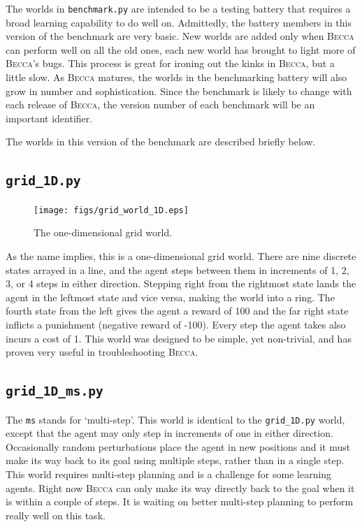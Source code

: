 The worlds in \texttt{benchmark.py} are intended to be a testing battery that requires a broad learning capability to do well on. Admittedly, the battery members in this version of the benchmark are very basic. New worlds are added only when \textsc{Becca} can perform well on all the old ones, each new world has brought to light more of \textsc{Becca}'s bugs. This process is great for ironing out the kinks in \textsc{Becca}, but a little slow. As \textsc{Becca} matures, the worlds in the benchmarking battery will also grow in number and sophistication. Since the benchmark is likely to change with each release of \textsc{Becca}, the version number of each benchmark will be an important identifier.

The worlds in this version of the benchmark are described briefly below.

\subsection{\texttt{grid\_1D.py}}

\begin{figure}
\centering
\texttt{[image: figs/grid\_world\_1D.eps]}
\caption{The one-dimensional grid world.}
\label{grid_1D}
\end{figure}

As the name implies, this is a one-dimensional grid world. There are nine discrete states arrayed in a line, and the agent steps between them in increments of 1, 2, 3, or 4 steps in either direction. Stepping right from the rightmost state lands the agent in the leftmost state and vice versa, making the world into a ring. The fourth state from the left gives the agent a reward of 100 and the far right state inflicts a punishment (negative reward of -100). Every step the agent takes also incurs a cost of  1. This world was designed to be simple, yet non-trivial, and has proven very useful in troubleshooting \textsc{Becca}.

\subsection{\texttt{grid\_1D\_ms.py}}

The \texttt{ms} stands for `multi-step'. This world is identical to the \texttt{grid\_1D.py} world, except that the agent may only step in increments of one in either direction. Occasionally random perturbations place the agent in new positions and it must make its way back to its goal using multiple steps, rather than in a single step. This world requires multi-step planning and is a challenge for some learning agents. Right now \textsc{Becca} can only make its way directly back to the goal when it is within a couple of steps. It is waiting on better multi-step planning to perform really well on this task.

